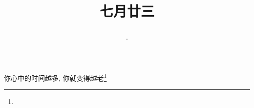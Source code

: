 \title{\date[d=26,m=8,y=2024][year:cn-y,年,month:cn,day:cn,日,·,weekday]·七月廿三 }
你心中的时间越多, 你就变得越老\footnote{ }

